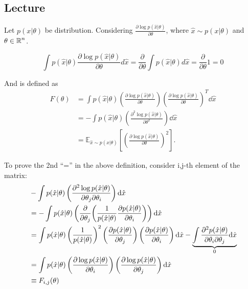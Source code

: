 \subsection{Lecture}

\begin{edefn}
    Let $p(x \vert \theta)$ be distribution. Considering $\frac{\partial \log p(\hat{x} | \theta)}{\partial \theta}$, where $\hat{x} \sim p(x | \theta)$ and $\theta \in \operatorname{\mathbb{R}}^n$.

    \begin{equation*}
        \int p(\hat{x} | \theta) \frac{\partial \log p(\hat{x} | \theta)}{\partial \theta} d\hat{x} = \frac{\partial}{\partial \theta} \int p(\hat{x} | \theta) d\hat{x} = \frac{\partial}{\partial \theta} 1 = 0
    \end{equation*}

    And  is defined as
    \begin{equation*}
        \begin{aligned}
            F(\theta) &= \int p(\hat{x} | \theta) \left( \frac{\partial \log p(\hat{x} | \theta)}{\partial \theta} \right) \left( \frac{\partial \log p(\hat{x} | \theta)}{\partial \theta} \right)^T \dd \hat{x} \\
                      &= -\int p(\hat{x} | \theta) \left( \frac{\partial^2 \log p(\hat{x} | \theta)}{\partial \theta^2} \right) \dd \hat{x} \\
                      &= \mathbb{E}_{\hat{x} \sim p(x | \theta)} \left[ \left( \frac{\partial \log p(\hat{x} | \theta)}{\partial \theta} \right)^2 \right].
        \end{aligned}
    \end{equation*}
\end{edefn}

To prove the 2nd ``='' in the above definition, consider i,j-th element of the matrix:
\begin{equation*}
    \begin{aligned}
        &-\int p(\hat{x} | \theta) \left( \pdv{\log p(\hat{x} | \theta)}{\theta_j}{\theta_i} \right) \dd \hat{x} \\
        &=-\int p(\hat{x} | \theta) \left( \pdv{\theta_j}(\frac{1}{p(\hat{x} | \theta)}\pdv{p(\hat{x} | \theta)}{\theta_i}) \right) \dd \hat{x} \\
        &=\int p(\hat{x} | \theta) \left(\frac{1}{p(\hat{x} | \theta)}\right)^2 \left(\pdv{p(\hat{x} | \theta)}{\theta_j}\right)\left(\pdv{p(\hat{x} | \theta)}{\theta_i}\right) \dd \hat{x}
          - \underbrace{\int \pdv{p(\hat{x} | \theta)}{\theta_i}{\theta_j} \dd \hat{x}}_{0} \\
        &= \int p(\hat{x} | \theta) \left( \pdv{\log p(\hat{x} | \theta)}{\theta_i} \right) \left( \pdv{\log p(\hat{x} | \theta)}{\theta_j} \right) \dd \hat{x} \\
        &\equiv F_{i,j}(\theta)
    \end{aligned}
\end{equation*}

